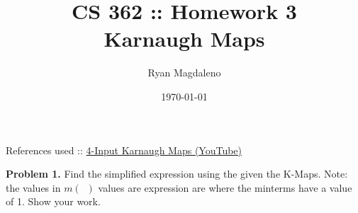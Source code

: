 \documentclass[11pt]{article}
\date{\vspace{-10pt}\today}
\title{CS 362 :\hspace{2px}: Homework 3\\\Large{Karnaugh Maps}\vspace{-10pt}}
\author{Ryan Magdaleno}
\begin{document}
\maketitle


\vspace{-24pt}References used :\hspace{2pt}:
\href{https://www.youtube.com/watch?v=xGZeZOq-aRo}
{4-Input Karnaugh Maps (YouTube)}\vspace{10pt}

\textbf{Problem 1.} Find the simplified expression using the given the K-Maps. Note: the 
values in $m(\,\,\,)$ values are expression are where the minterms have a value of 1. 
Show your work.
\end{document}
